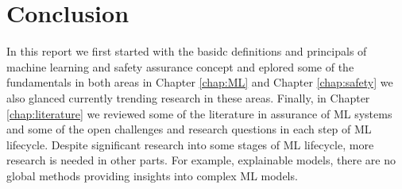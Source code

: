 \chapter{Conclusion}

In this report we first started with the basidc definitions and principals of machine learning and safety assurance concept and eplored some of the fundamentals in both areas in Chapter \ref{chap:ML} and Chapter \ref{chap:safety} we also glanced currently trending research in these areas. Finally, in Chapter \ref{chap:literature} we reviewed some of the literature in assurance of ML systems and some of the open challenges and research questions in each step of ML lifecycle. Despite significant research into some stages of ML lifecycle, more research is needed in other parts. For example, explainable models, there are no global methods providing insights into complex ML models.  %